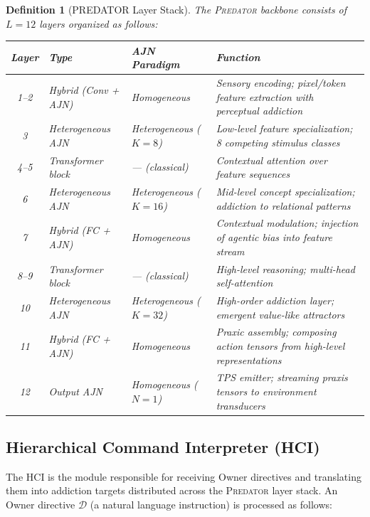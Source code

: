 \documentclass[12pt,a4paper]{article}
\newtheorem{definition}{Definition}[section]
\newcommand{\PREDATOR}{\textsc{Predator}}
\begin{document}
\begin{definition}[PREDATOR Layer Stack]
The \PREDATOR{} backbone consists of $L=12$ layers organized as follows:

\begin{center}
\begin{tabular}{@{}cllp{5.5cm}@{}}
\toprule
\textbf{Layer} & \textbf{Type} & \textbf{AJN Paradigm} & \textbf{Function}\\
\midrule
1--2  & Hybrid (Conv + AJN) & Homogeneous & Sensory encoding; pixel/token feature extraction with perceptual addiction\\
3     & Heterogeneous AJN   & Heterogeneous ($K=8$) & Low-level feature specialization; 8 competing stimulus classes\\
4--5  & Transformer block   & --- (classical) & Contextual attention over feature sequences\\
6     & Heterogeneous AJN   & Heterogeneous ($K=16$) & Mid-level concept specialization; addiction to relational patterns\\
7     & Hybrid (FC + AJN)   & Homogeneous & Contextual modulation; injection of agentic bias into feature stream\\
8--9  & Transformer block   & --- (classical) & High-level reasoning; multi-head self-attention\\
10    & Heterogeneous AJN   & Heterogeneous ($K=32$) & High-order addiction layer; emergent value-like attractors \cite{tapiador2024daf}\\
11    & Hybrid (FC + AJN)   & Homogeneous & Praxic assembly; composing action tensors from high-level representations\\
12    & Output AJN          & Homogeneous ($N=1$) & TPS emitter; streaming praxis tensors to environment transducers\\
\bottomrule
\end{tabular}
\end{center}
\end{definition}

\subsection{Hierarchical Command Interpreter (HCI)}

The HCI is the module responsible for receiving Owner directives and
translating them into addiction targets distributed across the \PREDATOR{}
layer stack. An Owner directive $\mathcal{D}$ (a natural language instruction)
is processed as follows:
\end{document}
